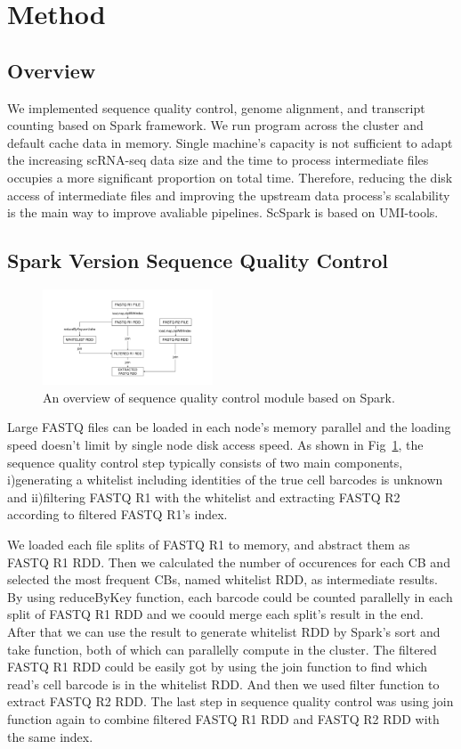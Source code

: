 \documentclass[10pt,journal,compsoc]{IEEEtran}
\begin{document}
\section{Method}
\subsection{Overview}
We implemented sequence quality control, genome alignment, and transcript counting based on Spark framework. 
We run program across the cluster and default cache data in memory. 
Single machine's capacity is not sufficient to adapt the increasing scRNA-seq data size and the time to process intermediate files occupies a more significant proportion on total time. 
Therefore, reducing the disk access of intermediate files and improving the upstream data process's scalability is the main way to improve avaliable pipelines. 
ScSpark is based on UMI-tools.

\subsection{Spark Version Sequence Quality Control}
\begin{figure}
	\includegraphics[width=0.45\textwidth]{fig1.pdf}
	\caption{An overview of sequence quality control module based on Spark.} \label{fig1}
\end{figure}  
Large FASTQ files can be loaded in each node's memory parallel and the loading speed doesn't limit by single node disk access speed. 
As shown in Fig~\ref{fig1}, the sequence quality control step typically consists of two main components, i)generating a whitelist including identities of the true cell barcodes is unknown and ii)filtering FASTQ R1 with the whitelist and extracting FASTQ R2 according to filtered FASTQ R1's index.

We loaded each file splits of FASTQ R1 to memory, and abstract them as FASTQ R1 RDD. 
Then we calculated the number of occurences for each CB and selected the most frequent CBs, named whitelist RDD, as intermediate results. 
By using reduceByKey function, each barcode could be counted parallelly in each split of FASTQ R1 RDD and we coould merge each split's result in the end. 
After that we can use the result to generate whitelist RDD by Spark's sort and take function, both of which can parallelly compute in the cluster. 
The filtered FASTQ R1 RDD could be easily got by using the join function to find which read's cell barcode is in the whitelist RDD. 
And then we used filter function to extract FASTQ R2 RDD. 
The last step in sequence quality control was using join function again to combine filtered FASTQ R1 RDD and FASTQ R2 RDD with the same index. 
\end{document}

